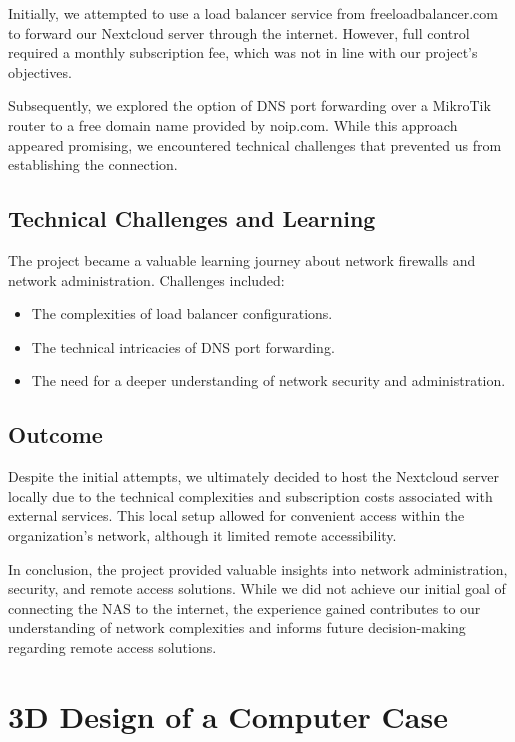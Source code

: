 Initially, we attempted to use a load balancer service from freeloadbalancer.com to forward our Nextcloud server through the internet. However, full control required a monthly subscription fee, which was not in line with our project's objectives.

Subsequently, we explored the option of DNS port forwarding over a MikroTik router to a free domain name provided by noip.com. While this approach appeared promising, we encountered technical challenges that prevented us from establishing the connection.

\subsection{Technical Challenges and Learning}

The project became a valuable learning journey about network firewalls and network administration. Challenges included:

\begin{itemize}
  \item The complexities of load balancer configurations.
  \item The technical intricacies of DNS port forwarding.
  \item The need for a deeper understanding of network security and administration.
\end{itemize}

\subsection{Outcome}

Despite the initial attempts, we ultimately decided to host the Nextcloud server locally due to the technical complexities and subscription costs associated with external services. This local setup allowed for convenient access within the organization's network, although it limited remote accessibility.

In conclusion, the project provided valuable insights into network administration, security, and remote access solutions. While we did not achieve our initial goal of connecting the NAS to the internet, the experience gained contributes to our understanding of network complexities and informs future decision-making regarding remote access solutions.

\section{3D Design of a Computer Case}

